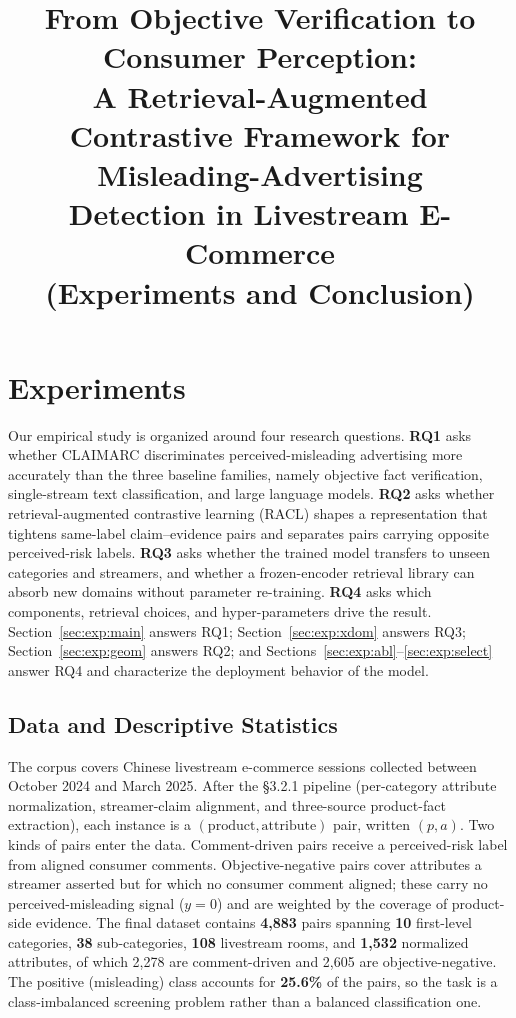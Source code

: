 \documentclass[11pt]{article}
\title{\vspace{-2em}From Objective Verification to Consumer Perception:\\
A Retrieval-Augmented Contrastive Framework for Misleading-Advertising\\
Detection in Livestream E-Commerce\\[0.4em]
\large (Experiments and Conclusion)}
\author{}
\date{}
\newcommand{\best}[1]{\textbf{#1}}
\begin{document}
\maketitle
\vspace{-3em}

\setcounter{section}{3}

\section{Experiments}
\label{sec:exp}

Our empirical study is organized around four research questions.
\textbf{RQ1} asks whether CLAIMARC discriminates perceived-misleading
advertising more accurately than the three baseline families, namely
objective fact verification, single-stream text classification, and large
language models. \textbf{RQ2} asks whether retrieval-augmented contrastive
learning (RACL) shapes a representation that tightens same-label claim--evidence
pairs and separates pairs carrying opposite perceived-risk labels.
\textbf{RQ3} asks whether the trained model transfers to unseen categories and
streamers, and whether a frozen-encoder retrieval library can absorb new domains
without parameter re-training. \textbf{RQ4} asks which components, retrieval
choices, and hyper-parameters drive the result. Section~\ref{sec:exp:main}
answers RQ1; Section~\ref{sec:exp:xdom} answers RQ3;
Section~\ref{sec:exp:geom} answers RQ2; and
Sections~\ref{sec:exp:abl}--\ref{sec:exp:select} answer RQ4 and characterize
the deployment behavior of the model.

\subsection{Data and Descriptive Statistics}
\label{sec:exp:data}

The corpus covers Chinese livestream e-commerce sessions collected between
October 2024 and March 2025. After the \S3.2.1 pipeline (per-category
attribute normalization, streamer-claim alignment, and three-source
product-fact extraction), each instance is a $(\text{product},
\text{attribute})$ pair, written $(p,a)$. Two kinds of pairs enter the data.
Comment-driven pairs receive a perceived-risk label from aligned consumer
comments. Objective-negative pairs cover attributes a streamer asserted but
for which no consumer comment aligned; these carry no perceived-misleading
signal ($y{=}0$) and are weighted by the coverage of product-side evidence.
The final dataset contains \best{4{,}883} pairs spanning \best{10} first-level
categories, \best{38} sub-categories, \best{108} livestream rooms, and
\best{1{,}532} normalized attributes, of which 2{,}278 are comment-driven and
2{,}605 are objective-negative. The positive (misleading) class accounts for
\best{25.6\%} of the pairs, so the task is a class-imbalanced screening
problem rather than a balanced classification one.
\end{document}
